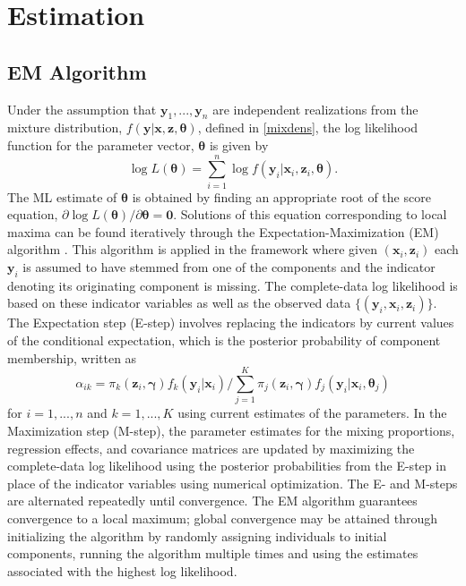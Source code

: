 \documentclass[10pt]{article}
\newcommand{\B}[0]{\mathbf}
\newcommand{\bs}[0]{\boldsymbol}
\begin{document}
\section{Estimation}
\subsection{EM Algorithm}
Under the assumption that $\B y_{1},...,\B y_{n}$ are independent realizations from the mixture distribution, $f(\B y | \B x, \B z, \bs\theta)$, defined in \ref{mixdens}, the log likelihood function for the parameter vector, $\bs \theta$ is given by
$$\log L(\bs\theta)=\sum^{n}_{i=1}\log f(\B y_{i}|\B x_{i},\B z_{i},\bs \theta).$$
The ML estimate of $\bs\theta$ is obtained by finding an appropriate root of the score equation, $\partial \log L(\bs\theta)/\partial \bs\theta=\B 0.$
Solutions of this equation corresponding to local maxima can be found iteratively through the Expectation-Maximization (EM) algorithm \cite{dempster1977}. This algorithm is applied in the framework where given $(\B x_{i},\B z_{i})$ each $\B y_{i}$ is assumed to have stemmed from one of the components and the indicator denoting its originating component is missing. The complete-data log likelihood is based on these indicator variables as well as the observed data $\{(\B y_{i}, \B x_{i}, \B z_{i})\}$. The Expectation step (E-step) involves replacing the indicators by current values of the conditional expectation, which is the posterior probability of component membership, written as
$$\alpha_{ik}=\pi_{k}(\B z_{i},\bs\gamma)f_{k}(\B y_{i}|\B x_{i})/\sum_{j=1}^{K}\pi_{j}(\B z_{i},\bs\gamma)f_{j}(\B y_{i}|\B x_{i},\bs \theta_{j})$$
for $i=1,...,n$ and $k=1,...,K$ using current estimates of the parameters. In the Maximization step (M-step), the parameter estimates for the mixing proportions, regression effects, and covariance matrices are updated by maximizing the complete-data log likelihood using the posterior probabilities from the E-step in place of the indicator variables using numerical optimization. The E- and M-steps are alternated repeatedly until convergence. The EM algorithm guarantees convergence to a local maximum; global convergence may be attained through initializing the algorithm by randomly assigning individuals to initial components, running the algorithm multiple times and using the estimates associated with the highest log likelihood.
\end{document}
